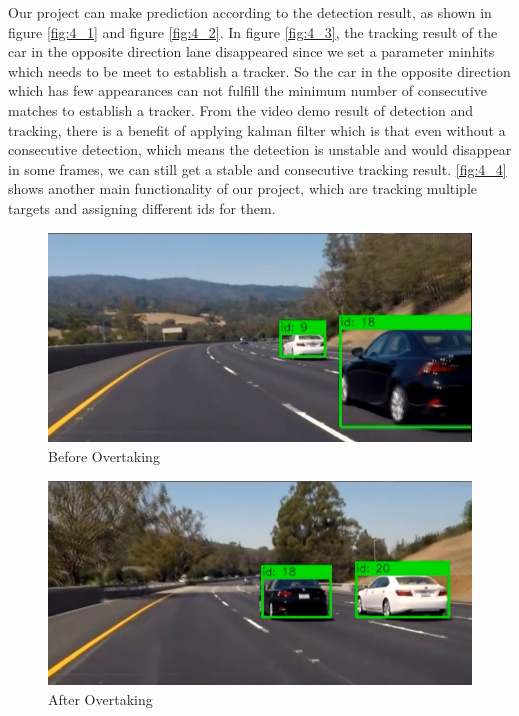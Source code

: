 \documentclass[10pt,twocolumn,letterpaper]{article}
\begin{document}
Our project can make prediction according to the detection result, as shown in figure \ref{fig:4_1} and figure \ref{fig:4_2}. In figure \ref{fig:4_3}, the tracking result of the car in the opposite direction lane disappeared since we set a parameter minhits which needs to be meet to establish a tracker. So the car in the opposite direction which has few appearances can not fulfill the minimum number of consecutive matches to establish a tracker. From the video demo result of detection and tracking, there is a benefit of applying kalman filter which is that even without a consecutive detection, which means the detection is unstable and would disappear in some frames, we can still get a stable and consecutive tracking result. \ref{fig:4_4} shows another main functionality of our project, which are tracking multiple targets and assigning different ids for them. 

\begin{figure}[t]
\begin{center}
   \includegraphics[width=1\linewidth]{overtake1.PNG}
\end{center}
   \caption{Before Overtaking}
\label{fig:4_5}
\end{figure}

\begin{figure}[t]
\begin{center}
   \includegraphics[width=1\linewidth]{overtake2.PNG}
\end{center}
   \caption{After Overtaking}
\label{fig:4_6}
\end{figure}
\end{document}
